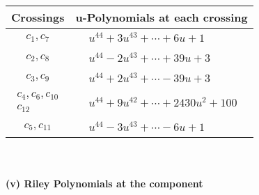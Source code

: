 \documentclass[1p]{elsarticle_modified}
\theoremstyle{definition}
\begin{document}
\begin{tabular}{m{50pt}|m{274pt}}
Crossings & \hspace{64pt}u-Polynomials at each crossing \\
\hline $$\begin{aligned}c_{1},c_{7}\end{aligned}$$&$\begin{aligned}
&u^{44}+3 u^{43}+\cdots+6 u+1
\end{aligned}$\\
\hline $$\begin{aligned}c_{2},c_{8}\end{aligned}$$&$\begin{aligned}
&u^{44}-2 u^{43}+\cdots+39 u+3
\end{aligned}$\\
\hline $$\begin{aligned}c_{3},c_{9}\end{aligned}$$&$\begin{aligned}
&u^{44}+2 u^{43}+\cdots-39 u+3
\end{aligned}$\\
\hline $$\begin{aligned}c_{4},c_{6},c_{10}\\c_{12}\end{aligned}$$&$\begin{aligned}
&u^{44}+9 u^{42}+\cdots+2430 u^2+100
\end{aligned}$\\
\hline $$\begin{aligned}c_{5},c_{11}\end{aligned}$$&$\begin{aligned}
&u^{44}-3 u^{43}+\cdots-6 u+1
\end{aligned}$\\
\hline
\end{tabular}\\~\\
\newpage\renewcommand{\arraystretch}{1}
\flushleft \textbf{(v) Riley Polynomials at the component}\newline \\
\end{document}
